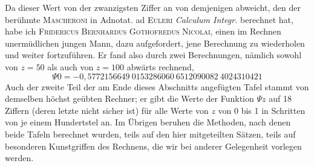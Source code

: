 \expandafter\def\csname HistoricalNoteText18\endcsname{Da dieser Wert von der zwanzigsten Ziffer an von demjenigen abweicht, den der berühmte \textsc{Mascheroni} in Adnotat. ad \textsc{Euleri} \textit{Calculum Integr.} berechnet hat, habe ich \textsc{Fridericus Bernhardus Gothofredus Nicolai}, einen im Rechnen unermüdlichen jungen Mann, dazu aufgefordert, jene Berechnung zu wiederholen und weiter fortzuführen. Er fand also durch zwei Berechnungen, nämlich sowohl von $z=50$ als auch von $z=100$ abwärts rechnend,
\[
\Psi0=-0{,}5772156649\ 0153286060\ 6512090082\ 4024310421
\]
Auch der zweite Teil der am Ende dieses Abschnitts angefügten Tafel stammt von demselben höchst geübten Rechner; er gibt die Werte der Funktion $\Psi z$ auf 18 Ziffern (deren letzte nicht sicher ist) für alle Werte von $z$ von 0 bis 1 in Schritten von je einem Hundertstel an. Im Übrigen beruhen die Methoden, nach denen beide Tafeln berechnet wurden, teils auf den hier mitgeteilten Sätzen, teils auf besonderen Kunstgriffen des Rechnens, die wir bei anderer Gelegenheit vorlegen werden.}
